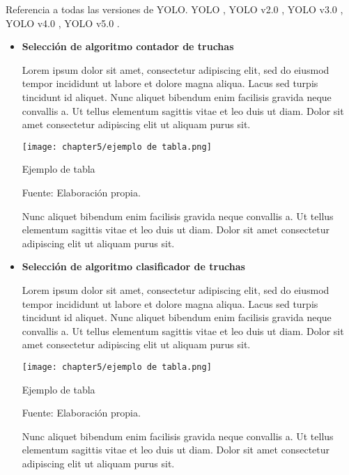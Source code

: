 Referencia a todas las versiones de YOLO. YOLO \cite{Redmon2016}, YOLO v2.0 \cite{Redmon2017}, YOLO v3.0 \cite{Redmon2018}, YOLO v4.0 \cite{Solawetz2020}, YOLO v5.0 \cite{bochkovskiy2020yolov4}.


\begin{itemize}
	
	\item \textbf{Selección de algoritmo contador de truchas} 
	
	Lorem ipsum dolor sit amet, consectetur adipiscing elit, sed do eiusmod tempor incididunt ut labore et dolore magna aliqua. Lacus sed turpis tincidunt id aliquet. Nunc aliquet bibendum enim facilisis gravida neque convallis a. Ut tellus elementum sagittis vitae et leo duis ut diam. Dolor sit amet consectetur adipiscing elit ut aliquam purus sit.
	
	\begin{myfigure}[H]
		\centering
		\texttt{[image: chapter5/ejemplo de tabla.png]}
		\caption{Ejemplo de tabla}
		\begin{myflushleftportland}
			Fuente: Elaboración propia.
		\end{myflushleftportland}
		\label{fig:ejemplo de tabla}
	\end{myfigure}

	Nunc aliquet bibendum enim facilisis gravida neque convallis a. Ut tellus elementum sagittis vitae et leo duis ut diam. Dolor sit amet consectetur adipiscing elit ut aliquam purus sit.
	
	\item \textbf{Selección de algoritmo clasificador de truchas} 
	
	Lorem ipsum dolor sit amet, consectetur adipiscing elit, sed do eiusmod tempor incididunt ut labore et dolore magna aliqua. Lacus sed turpis tincidunt id aliquet. Nunc aliquet bibendum enim facilisis gravida neque convallis a. Ut tellus elementum sagittis vitae et leo duis ut diam. Dolor sit amet consectetur adipiscing elit ut aliquam purus sit.
	
	\begin{myfigure}[H]
		\centering
		\texttt{[image: chapter5/ejemplo de tabla.png]}
		\caption{Ejemplo de tabla}
		\begin{myflushleftportland}
			Fuente: Elaboración propia.
		\end{myflushleftportland}
		\label{fig:ejemplo de tabla}
	\end{myfigure}
	
	Nunc aliquet bibendum enim facilisis gravida neque convallis a. Ut tellus elementum sagittis vitae et leo duis ut diam. Dolor sit amet consectetur adipiscing elit ut aliquam purus sit.
	
\end{itemize}

